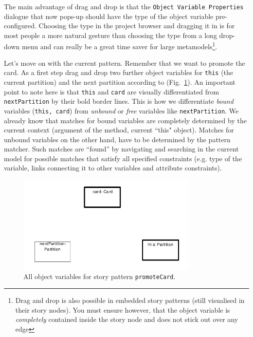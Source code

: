 The main advantage of drag and drop is that the \texttt{Object Variable
Pro\-per\-ties} dialogue that now pops-up should have the type of the object
variable pre-configured. Choosing the type in the project browser and dragging it in
is for most people a more natural gesture than choosing the type from a long
drop-down menu and can really be a great time saver for large
metamodels\footnote{Drag and drop is also possible in embedded story patterns
(still visualised in their story nodes).  You must ensure however, that the
object variable is \emph{completely} contained inside the story node and does
not stick out over any edge}.

Let's move on with the current pattern. Remember that we want to promote the
card.  As a first step drag and drop two further object variables for
\texttt{this} (the current partition) and the next partition according to
(Fig.~\ref{fig:sdm_check_complete_sp}).  An important point to note here is
that \texttt{this} and \texttt{card} are visually differentiated from
\texttt{nextPartition} by their bold border lines. This is how we differentiate
\emph{bound}  variables (\texttt{this, card}) from
\emph{unbound} or \emph{free} variables like \texttt{nextPartition}.  We already know that matches for bound variables are completely determined by the current
context (argument of the method, current ``this" object).  Matches for unbound
variables on the other hand, have to be determined by the pattern matcher.  Such
matches are ``found'' by navigating and searching in the current model for
possible matches that satisfy all specified constraints (e.g. type of the
variable, links connecting it to other variables and attribute constraints).

\begin{figure}[htbp]
\begin{center}
  \includegraphics[width=0.8\textwidth]{pics/sdmBilder/check/sdm25.pdf}
  \caption{All object variables for story pattern \texttt{promoteCard}.}
  \label{fig:sdm_check_complete_sp}
\end{center}
\end{figure}

